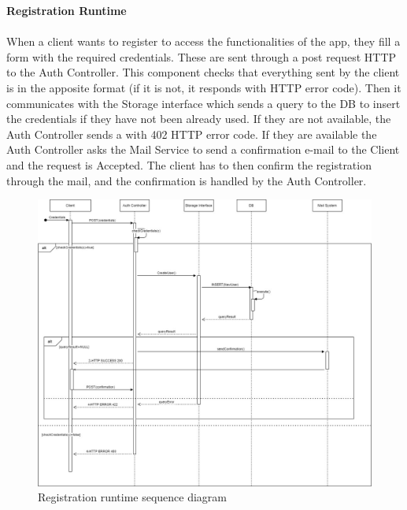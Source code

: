 \documentclass[a4paper, 12pt, oneside, table]{article}
\begin{document}
\textbf{Registration Runtime}\\
\\
When a client wants to register to access the functionalities of the app, they fill a form with the required credentials. These are sent through a post request HTTP to the Auth Controller. This component checks that everything sent by the client is in the apposite format (if it is not, it responds with HTTP error code). Then it communicates with the Storage interface which sends a query to the DB to insert the credentials if they have not been already used. If they are not available, the Auth Controller sends a with 402 HTTP error code. If they are available the Auth Controller asks the Mail Service to send a confirmation e-mail to the Client and the request is Accepted. The client has to then confirm the registration through the mail, and the confirmation is handled by the Auth Controller.
\begin{figure}[H]
\centering
	\centering
  	\includegraphics[height=0.5\textheight, scale=0.5, keepaspectratio]{img/seq_diag/Register_Runtime.jpg}
	\caption{Registration runtime sequence diagram}
 	\label{regRunTime}
\end{figure}
\end{document}
